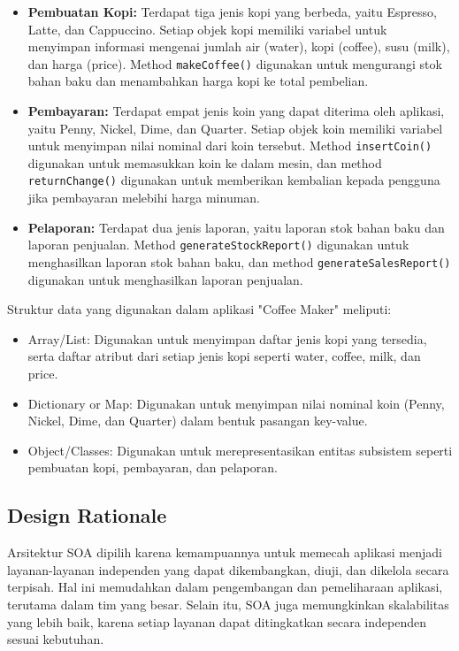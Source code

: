\documentclass[12pt]{article}
\begin{document}
\begin{itemize}
\item \textbf{Pembuatan Kopi:} Terdapat tiga jenis kopi yang berbeda, yaitu Espresso, Latte, dan Cappuccino. Setiap objek kopi memiliki variabel untuk menyimpan informasi mengenai jumlah air (water), kopi (coffee), susu (milk), dan harga (price). Method \texttt{makeCoffee()} digunakan untuk mengurangi stok bahan baku dan menambahkan harga kopi ke total pembelian.    
\item \textbf{Pembayaran:} Terdapat empat jenis koin yang dapat diterima oleh aplikasi, yaitu Penny, Nickel, Dime, dan Quarter. Setiap objek koin memiliki variabel untuk menyimpan nilai nominal dari koin tersebut. Method \texttt{insertCoin()} digunakan untuk memasukkan koin ke dalam mesin, dan method \texttt{returnChange()} digunakan untuk memberikan kembalian kepada pengguna jika pembayaran melebihi harga minuman.
\item \textbf{Pelaporan:} Terdapat dua jenis laporan, yaitu laporan stok bahan baku dan laporan penjualan. Method \texttt{generateStockReport()} digunakan untuk menghasilkan laporan stok bahan baku, dan method \texttt{generateSalesReport()} digunakan untuk menghasilkan laporan penjualan.
\end{itemize}

    

Struktur data yang digunakan dalam aplikasi "Coffee Maker" meliputi:
\begin{itemize}
\item Array/List: Digunakan untuk menyimpan daftar jenis kopi yang tersedia, serta daftar atribut dari setiap jenis kopi seperti water, coffee, milk, dan price.
\item Dictionary or Map: Digunakan untuk menyimpan nilai nominal koin (Penny, Nickel, Dime, dan Quarter) dalam bentuk pasangan key-value.
\item Object/Classes: Digunakan untuk merepresentasikan entitas subsistem seperti pembuatan kopi, pembayaran, dan pelaporan.
\end{itemize}

\subsection{Design Rationale}
Arsitektur SOA dipilih karena kemampuannya untuk memecah aplikasi menjadi layanan-layanan independen yang dapat dikembangkan, diuji, dan dikelola secara terpisah. Hal ini memudahkan dalam pengembangan dan pemeliharaan aplikasi, terutama dalam tim yang besar. Selain itu, SOA juga memungkinkan skalabilitas yang lebih baik, karena setiap layanan dapat ditingkatkan secara independen sesuai kebutuhan.
\end{document}
